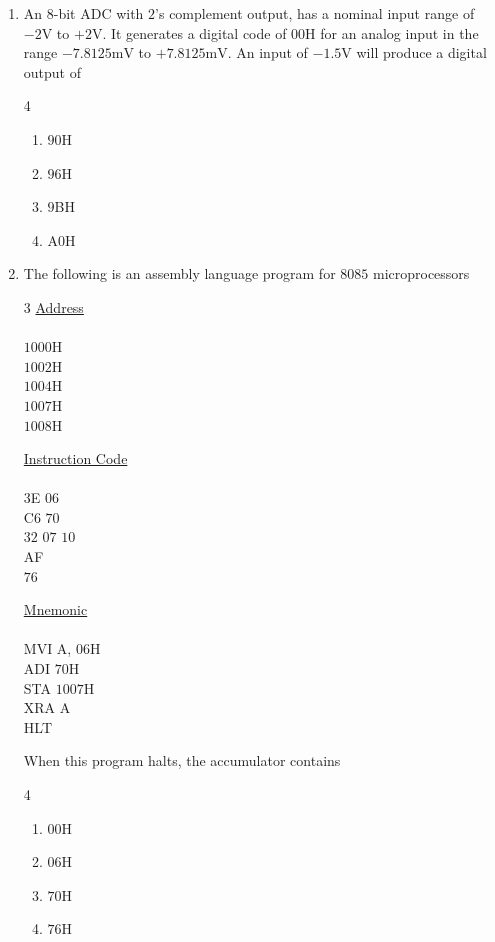 \documentclass[journal,12pt,onecolumn]{IEEEtran}
\theoremstyle{remark}
\begin{document}
\begin{enumerate}
\item An $8$-bit ADC with $2$'s complement output, has a nominal input range of $-2\text{V}$ to $+2$V. It generates a digital code of $00$H for an analog input in the range $-7.8125\text{mV}$ to $+7.8125\text{mV}$. An input of $-1.5\text{V}$ will produce a digital output of \par  \hfill{}
\begin{multicols}{4}
    \begin{enumerate}
        \item $90$H
        \item $96$H
        \item $9$BH
        \item A$0$H
\end{enumerate}
\end{multicols} 

\vspace{0.5cm}

\item The following is an assembly language program for $8085$ microprocessors
\begin{multicols}{3}
    \underline{Address}\\\\
    $1000$H\\
    $1002$H\\
    $1004$H\\
    $1007$H\\
    $1008$H
    
    \columnbreak
    
    \underline{Instruction Code}\\\\
    $3$E $06$\\
    C$6$ $70$\\
    $32$ $07$ $10$\\
    AF\\
    $76$
    
    \columnbreak
    
    \underline{Mnemonic}\\\\
    MVI   A, $06$H\\
    ADI   $70$H\\
    STA   $1007$H\\
    XRA   A\\
    HLT\\   
\end{multicols}
 When this program halts, the accumulator contains \par \hfill{}
\begin{multicols}{4}
    \begin{enumerate}
        \item $00$H
        \item $06$H
        \item $70$H
        \item $76$H
\end{enumerate}
\end{multicols} 


\end{enumerate}
\end{document}
